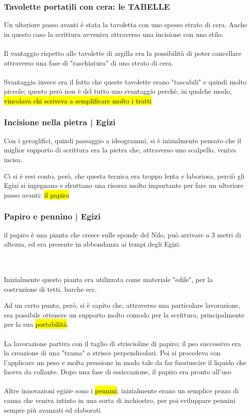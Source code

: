     \subsubsection{Tavolette portatili con cera: le TABELLE}
    Un ulteriore passo avanti è stata la tavoletta con uno spesso strato di cera. Anche in questo caso la scrittura avveniva attraverso una incisione con uno stilo.
    \\\\Il vantaggio rispetto alle tavolette di argilla era la possibilità di poter cancellare attraverso una fase di "raschiatura" di uno strato di cera.
    \\\\ Svantaggio invece era il fatto che queste tavolette erano "tascabili" e quindi molto piccole; questo però non è del tutto uno svantaggio perchè, in qualche modo, \hl{vincolava chi scriveva a semplificare molto i tratti}
    \subsubsection{Incisione nella pietra | Egizi}
    Con i geroglifici, quindi passaggio a ideogrammi, si è inizialmente pensato che il miglior supporto di scrittura era la pietra che, attraverso uno scalpello, veniva incisa.

    Ci si è resi conto, però, che questa tecnica era troppo lenta e laboriosa, perciò gli Egizi si ingegnano e sfruttano una risorsa molto importante per fare un ulteriore passo avanti: \hl{il papiro}
    \subsubsection{Papiro e pennino | Egizi}
    il papiro è una pianta che cresce sulle sponde del Nilo, può arrivare a 3 metri di altezza, ed era presente in abbondanza ai tempi degli Egizi.

    \\\\Inizialmente questo pianta era utilizzata come materiale "edile", per la costruzione di tetti, barche ecc.
    
    Ad un certo punto, però, si è capito che, attraverso una particolare lavorazione, era possibile ottenere un supporto molto comodo per la scrittura, principalmente per la sua \hl{portabilità}.
    \\\\La lavorazione partiva con il taglio di striscioline di papiro; il pso successivo era la creazione di una "trama" a strisce perpendicolari. Poi si procedeva con l'applicare un peso e molta pressione in modo tale da far fuoriuscire il liquido che faceva da collante. Dopo una fase di essiccazione, il papiro era pronto all'uso
    \\\\Altre innovazioni egizie sono i \hl{pennini}; inizialmente erano un semplice pezzo di canna che veniva intinto in una sorta di inchiostro, per poi sviluppare pennini sempre più avanzati ed elaborati

